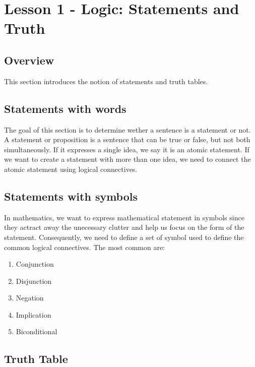 \documentclass{article}
\begin{document}
\section{Lesson 1 - Logic: Statements and Truth}

\subsection{Overview}

This section introduces the notion of statements and truth tables.

\subsection{Statements with words}

\par
The goal of this section is to determine wether a sentence is a statement or not.\\

A statement or proposition is a sentence that can be true or false, but not both
simultaneously. If it expresses a single idea, we say it is an atomic statement.
If we want to create a statement with more than one idea, we need to connect the
atomic statement using logical connectives.

\subsection{Statements with symbols}

In mathematics, we want to express mathematical statement in symbols since they
actract away the unecessary clutter and help us focus on the form of the statement.
Consequently, we need to define a set of symbol used to define the common logical
connectives. The most common are:

\begin{enumerate}
    \item Conjunction
    \item Disjunction
    \item Negation
    \item Implication
    \item Biconditional
\end{enumerate}

\subsection{Truth Table}
\end{document}
